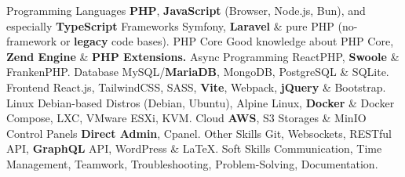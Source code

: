 
\begin{cvskills}

  \cvskill
    {Programming Languages} %
    {\textbf{PHP}, \textbf{JavaScript} (Browser, Node.js, Bun), and especially \textbf{TypeScript}} %
  \cvskill
    {Frameworks} %
    {Symfony, \textbf{Laravel} \& pure PHP (no-framework or \textbf{legacy} code bases).} %
  \cvskill
    {PHP Core} %
    {Good knowledge about PHP Core, \textbf{Zend Engine} \& \textbf{PHP Extensions.}} %
  \cvskill
    {Async Programming} %
    {ReactPHP, \textbf{Swoole} \& FrankenPHP.} %
  \cvskill
    {Database} %
    {MySQL/\textbf{MariaDB}, MongoDB, PostgreSQL \& SQLite.} %
  \cvskill
    {Frontend} %
    {React.js, TailwindCSS, SASS, \textbf{Vite}, Webpack, \textbf{jQuery} \& Bootstrap.} %
  \cvskill
    {Linux} %
    {Debian-based Distros (Debian, Ubuntu), Alpine Linux, \textbf{Docker} \& Docker Compose, LXC, VMware ESXi, KVM.} %
  \cvskill
    {Cloud} %
    {\textbf{AWS}, S3 Storages \& MinIO} %
  \cvskill
    {Control Panels} %
    {\textbf{Direct Admin}, Cpanel.} %
  \cvskill
    {Other Skills} %
    {Git, Websockets, RESTful API, \textbf{GraphQL} API, WordPress \& \LaTeX.} %
    \cvskill
    {Soft Skills} %
    {Communication, Time Management, Teamwork, Troubleshooting, Problem-Solving, Documentation.} %

\end{cvskills}
